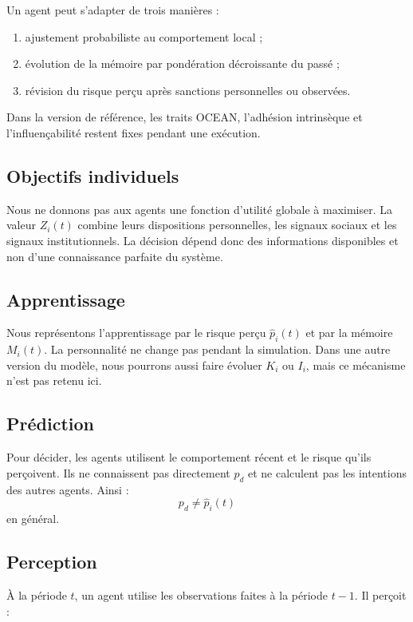 \documentclass[11pt,a4paper]{article}
\begin{document}
Un agent peut s’adapter de trois manières :

\begin{enumerate}
  \item ajustement probabiliste au comportement local ;
  \item évolution de la mémoire par pondération décroissante du passé ;
  \item révision du risque perçu après sanctions personnelles ou observées.
\end{enumerate}

Dans la version de référence, les traits OCEAN, l’adhésion intrinsèque et
l’influençabilité restent fixes pendant une exécution.

\subsection{Objectifs individuels}

Nous ne donnons pas aux agents une fonction d’utilité globale à maximiser. La
valeur $Z_i(t)$ combine leurs dispositions personnelles, les signaux sociaux et
les signaux institutionnels. La décision dépend donc des informations
disponibles et non d’une connaissance parfaite du système.

\subsection{Apprentissage}

Nous représentons l’apprentissage par le risque perçu $\widehat p_i(t)$ et par
la mémoire $M_i(t)$. La personnalité ne change pas pendant la simulation. Dans
une autre version du modèle, nous pourrons aussi faire évoluer $K_i$ ou $I_i$,
mais ce mécanisme n’est pas retenu ici.

\subsection{Prédiction}

Pour décider, les agents utilisent le comportement récent et le risque qu’ils
perçoivent. Ils ne connaissent pas directement $p_d$ et ne calculent pas les
intentions des autres agents. Ainsi :
\[
p_d \neq \widehat p_i(t)
\]
en général.

\subsection{Perception}

À la période $t$, un agent utilise les observations faites à la période
$t-1$. Il perçoit :
\end{document}
